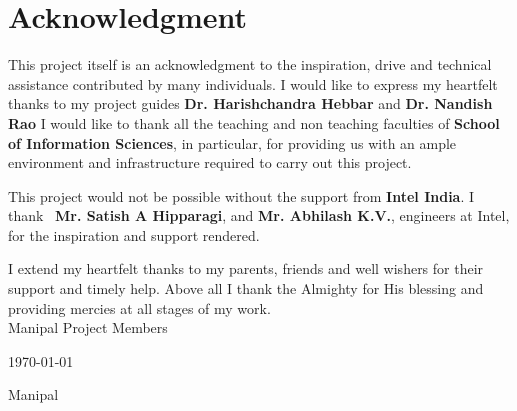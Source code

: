 \documentclass{mainreport}
\begin{document}
\maketitle
\makecertificate

\parindent 10mm
\chapter*{Acknowledgment}\label{ack}
{\label{ack} 

\hspace{6mm} This project itself is an acknowledgment to the inspiration, drive and technical
assistance contributed by many individuals. I would like to express my heartfelt thanks to my project guides 
{\bf Dr. Harishchandra Hebbar} and {\bf Dr. Nandish Rao}
I would like to thank all the teaching and non teaching faculties of {\bf School of Information Sciences}, 
in particular, for providing us with an ample environment and
infrastructure required to carry out this project. 

This project would not be possible without the support from {\bf Intel India}. I thank \
{\bf Mr. Satish A Hipparagi}, and {\bf Mr. Abhilash K.V.}, engineers at Intel,
for the inspiration and support rendered.

I extend my heartfelt thanks to my parents, friends and well wishers for their 
support and timely help. Above all I thank the Almighty for His blessing and 
providing mercies at all stages of my work. \\[2cm]




\noindent Manipal \hfill Project Members

\noindent \today \hfill \institutename

 \hfill Manipal





}
\end{document}
